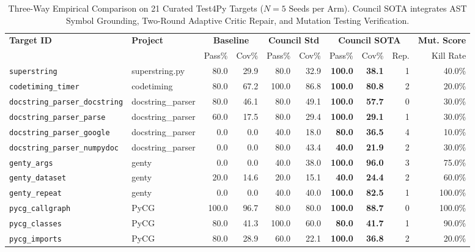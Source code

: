 \documentclass[conference]{IEEEtran}
\begin{document}
\begin{table}[t]
\centering
\small
\caption{Three-Way Empirical Comparison on 21 Curated Test4Py Targets ($N=5$ Seeds per Arm). Council SOTA integrates AST Symbol Grounding, Two-Round Adaptive Critic Repair, and Mutation Testing Verification.}
\label{tab:sota_results}
\begin{tabular}{ll|rr|rr|rrr|r}
\toprule
\textbf{Target ID} & \textbf{Project} & \multicolumn{2}{c|}{\textbf{Baseline}} & \multicolumn{2}{c|}{\textbf{Council Std}} & \multicolumn{3}{c|}{\textbf{Council SOTA}} & \textbf{Mut. Score} \\
 & & Pass\% & Cov\% & Pass\% & Cov\% & Pass\% & Cov\% & Rep. & Kill Rate \\
\midrule
\texttt{superstring} & superstring.py & 80.0 & 29.9 & 80.0 & 32.9 & \textbf{100.0} & \textbf{38.1} & 1 & 40.0\% \\
\texttt{codetiming\_timer} & codetiming & 80.0 & 67.2 & 100.0 & 86.8 & \textbf{100.0} & \textbf{80.8} & 2 & 20.0\% \\
\texttt{docstring\_parser\_docstring} & docstring\_parser & 80.0 & 46.1 & 80.0 & 49.1 & \textbf{100.0} & \textbf{57.7} & 0 & 30.0\% \\
\texttt{docstring\_parser\_parse} & docstring\_parser & 60.0 & 17.5 & 80.0 & 29.4 & \textbf{100.0} & \textbf{29.1} & 1 & 30.0\% \\
\texttt{docstring\_parser\_google} & docstring\_parser & 0.0 & 0.0 & 40.0 & 18.0 & \textbf{80.0} & \textbf{36.5} & 4 & 10.0\% \\
\texttt{docstring\_parser\_numpydoc} & docstring\_parser & 0.0 & 0.0 & 80.0 & 43.4 & \textbf{40.0} & \textbf{21.9} & 2 & 30.0\% \\
\texttt{genty\_args} & genty & 0.0 & 0.0 & 40.0 & 38.0 & \textbf{100.0} & \textbf{96.0} & 3 & 75.0\% \\
\texttt{genty\_dataset} & genty & 20.0 & 14.6 & 20.0 & 15.1 & \textbf{40.0} & \textbf{24.4} & 2 & 60.0\% \\
\texttt{genty\_repeat} & genty & 0.0 & 0.0 & 40.0 & 40.0 & \textbf{100.0} & \textbf{82.5} & 1 & 100.0\% \\
\texttt{pycg\_callgraph} & PyCG & 100.0 & 96.7 & 80.0 & 80.0 & \textbf{100.0} & \textbf{88.7} & 0 & 100.0\% \\
\texttt{pycg\_classes} & PyCG & 80.0 & 41.3 & 100.0 & 60.0 & \textbf{80.0} & \textbf{41.7} & 1 & 90.0\% \\
\texttt{pycg\_imports} & PyCG & 80.0 & 28.9 & 60.0 & 22.1 & \textbf{100.0} & \textbf{36.8} & 2 & 20.0\% \\

\end{tabular}
\end{table}
\end{document}
